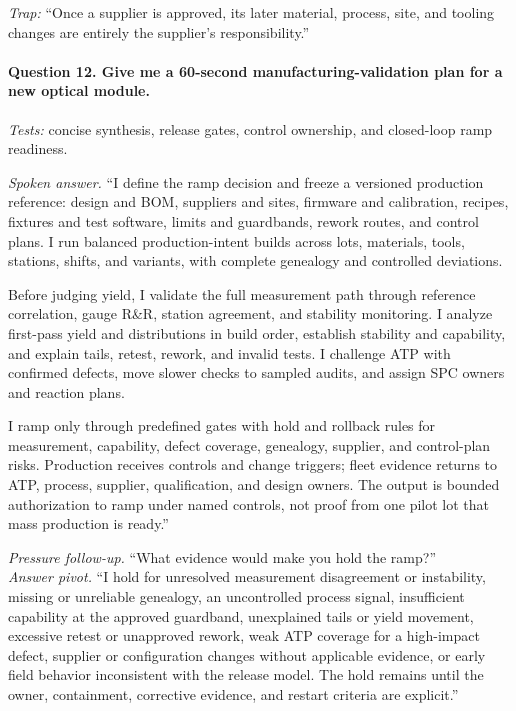 \textit{Trap:} ``Once a supplier is approved, its later material, process,
site, and tooling changes are entirely the supplier's responsibility.''

\paragraph{Question 12. Give me a 60-second manufacturing-validation plan for a
new optical module.}
\textit{Tests:} concise synthesis, release gates, control ownership, and
closed-loop ramp readiness.

\textit{Spoken answer.}
``I define the ramp decision and freeze a versioned production reference:
design and BOM, suppliers and sites, firmware and calibration, recipes,
fixtures and test software, limits and guardbands, rework routes, and control
plans. I run balanced production-intent builds across lots, materials, tools,
stations, shifts, and variants, with complete genealogy and controlled
deviations.

Before judging yield, I validate the full measurement path through reference
correlation, gauge R\&R, station agreement, and stability monitoring. I analyze
first-pass yield and distributions in build order, establish stability and
capability, and explain tails, retest, rework, and invalid tests. I challenge
ATP with confirmed defects, move slower checks to sampled audits, and assign
SPC owners and reaction plans.

I ramp only through predefined gates with hold and rollback rules for
measurement, capability, defect coverage, genealogy, supplier, and control-plan
risks. Production receives controls and change triggers; fleet evidence returns
to ATP, process, supplier, qualification, and design owners. The output is
bounded authorization to ramp under named controls, not proof from one pilot
lot that mass production is ready.''

\textit{Pressure follow-up.} ``What evidence would make you hold the ramp?''\\
\textit{Answer pivot.} ``I hold for unresolved measurement disagreement or
instability, missing or unreliable genealogy, an uncontrolled process signal,
insufficient capability at the approved guardband, unexplained tails or yield
movement, excessive retest or unapproved rework, weak ATP coverage for a
high-impact defect, supplier or configuration changes without applicable
evidence, or early field behavior inconsistent with the release model. The hold
remains until the owner, containment, corrective evidence, and restart criteria
are explicit.''

